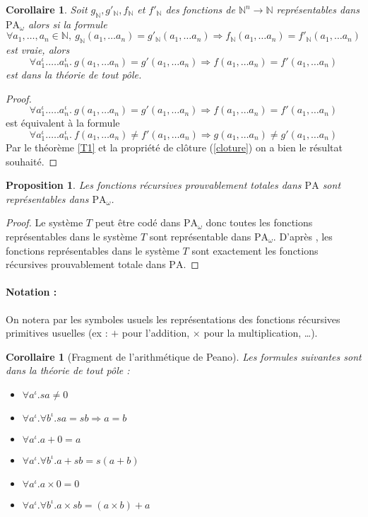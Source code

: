 \documentclass[a4paper,12pt]{article}
\newtheorem{prop}[theo]{Proposition}
\newtheorem{coro}[theo]{Corollaire}
\theoremstyle{rmqstyle}
\newcommand{\N}{\mathbb{N}}
\newcommand{\PA}{\mathrm{PA}}
\renewcommand{\implies}{\Rightarrow}
\begin{document}
\begin{coro}
\label{C1}
Soit $g_\N, g'_\N, f_\N$ et  $f'_\N$ des fonctions de $\N^n \to \N$ représentables dans $\PA_\omega$ alors si la formule 
$$\forall a_1, \dots, a_n \in \N, \ g_\N (a_1, \dots a_n) = g'_\N (a_1, \dots a_n) \implies f_\N(a_1, \dots a_n) = f'_\N (a_1, \dots a_n)$$
est vraie, alors 
$$\forall a_1^\iota. \dots. a_n^\iota. \ g(a_1, \dots a_n) = g'(a_1, \dots a_n) \implies  f(a_1, \dots a_n) = f'(a_1, \dots a_n)$$ 
est dans la théorie de tout pôle.
\end{coro}

\begin{proof}
$$\forall a_1^\iota. \dots. a_n^\iota. \ g(a_1, \dots a_n) = g'(a_1, \dots a_n) \implies  f(a_1, \dots a_n) = f'(a_1, \dots a_n)$$
est équivalent à la formule 
$$\forall a_1^\iota. \dots. a_n^\iota. \ f(a_1, \dots a_n) \neq f'(a_1, \dots a_n) \implies  g(a_1, \dots a_n) \neq g'(a_1, \dots a_n)$$
Par le théorème \ref{T1} et la propriété de clôture (\ref{cloture}) on a bien le résultat souhaité.
\end{proof}

\begin{prop}
Les fonctions récursives prouvablement totales dans $\PA$ sont représentables dans $\PA_\omega$.
\end{prop}

\begin{proof}
Le système $T$ peut être codé dans $\PA_\omega$ donc toutes les fonctions représentables dans le système $T$ sont représentable dans $\PA_\omega$. D'après \cite{MiquelF}, les fonctions représentables dans le système $T$ sont exactement les fonctions récursives prouvablement totale dans $\PA$.
\end{proof}

\paragraph{Notation :} On notera par les symboles usuels les représentations des fonctions récursives primitives usuelles (ex : $+$ pour l'addition, $\times$ pour la multiplication, \dots).

\begin{coro}[Fragment de l'arithmétique de Peano]
Les formules suivantes sont dans la théorie de tout pôle :
\begin{itemize}
\setlength\itemsep{ -1 em}
\item $\forall a^\iota. sa \neq 0$\\
\item $\forall a^\iota. \forall b^\iota. sa = sb \implies a = b$\\
\item $\forall a^\iota. a + 0 = a$\\
\item $\forall a^\iota. \forall b^\iota. a + sb = s(a + b)$\\
\item $\forall a^\iota. a \times 0 = 0$\\
\item $\forall a^\iota. \forall b^\iota. a \times sb = (a \times b) + a$
\end{itemize}
\end{coro}
\end{document}
